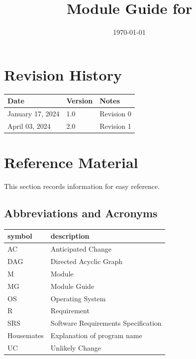 \documentclass[12pt, titlepage]{article}
\begin{document}
\title{Module Guide for \progname{}} 
\author{\authname}
\date{\today}

\maketitle


\section{Revision History}

\begin{tabularx}{\textwidth}{p{3cm}p{2cm}X}
\toprule {\bf Date} & {\bf Version} & {\bf Notes}\\
\midrule
January 17, 2024 & 1.0 & Revision 0\\
April 03, 2024 & 2.0 & Revision 1\\
\bottomrule
\end{tabularx}

\newpage

\section{Reference Material}

This section records information for easy reference.

\subsection{Abbreviations and Acronyms}

\renewcommand{\arraystretch}{1.2}
\begin{tabular}{l l} 
  \toprule		
  \textbf{symbol} & \textbf{description}\\
  \midrule 
  AC & Anticipated Change\\
  DAG & Directed Acyclic Graph \\
  M & Module \\
  MG & Module Guide \\
  OS & Operating System \\
  R & Requirement\\
  SRS & Software Requirements Specification\\
  Housemates & Explanation of program name\\
  UC & Unlikely Change \\
  \bottomrule
\end{tabular}\\
\end{document}
